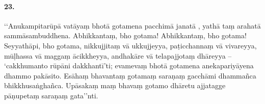 \paragraph{23.} ‘‘Anukampitarūpā vatāyaṃ bhotā gotamena pacchimā janatā , yathā taṃ arahatā sammāsambuddhena. Abhikkantaṃ, bho gotama! Abhikkantaṃ, bho gotama! Seyyathāpi, bho gotama, nikkujjitaṃ vā ukkujjeyya, paṭicchannaṃ vā vivareyya, mūḷhassa vā maggaṃ ācikkheyya, andhakāre vā telapajjotaṃ dhāreyya – ‘cakkhumanto rūpāni dakkhantī’ti; evamevaṃ bhotā gotamena anekapariyāyena dhammo pakāsito. Esāhaṃ bhavantaṃ gotamaṃ saraṇaṃ gacchāmi dhammañca bhikkhusaṅghañca. Upāsakaṃ maṃ bhavaṃ gotamo dhāretu ajjatagge pāṇupetaṃ saraṇaṃ gata’’nti.

